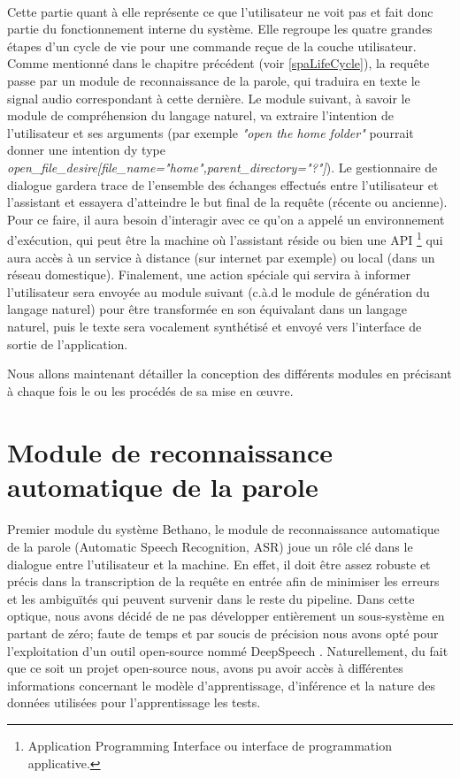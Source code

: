 	\paragraph{}
	\label{system_layer}
	Cette partie quant à elle représente ce que l'utilisateur ne voit pas et fait donc partie du fonctionnement interne du système. Elle regroupe les quatre grandes étapes d'un cycle de vie pour une commande reçue de la couche utilisateur. Comme mentionné dans le chapitre précédent (voir \ref{spaLifeCycle}), la requête passe par un module de reconnaissance de la parole, qui traduira en texte le signal audio correspondant à cette dernière. Le module suivant, à savoir le module de compréhension du langage naturel, va extraire l'intention de l'utilisateur et ses arguments (par exemple \textit{"open the home folder"} pourrait donner  une intention dy type  \textit{open\_file\_desire[file\_name="home",parent\_directory="?"]}). Le gestionnaire de dialogue gardera trace de l'ensemble des échanges effectués entre l'utilisateur et l'assistant et essayera d'atteindre le but final de la requête (récente ou ancienne). Pour ce faire, il aura besoin d'interagir avec ce qu'on a appelé un environnement d'exécution, qui peut être la machine où l'assistant réside ou bien une API \footnote{Application Programming Interface ou interface de programmation applicative.} qui aura accès à un service à distance (sur internet par exemple) ou local (dans un réseau domestique). Finalement, une action spéciale qui servira à informer l'utilisateur sera envoyée au module suivant (c.à.d le module de génération du langage naturel) pour être transformée en son équivalant dans un langage naturel, puis le texte sera vocalement synthétisé et envoyé vers l'interface de sortie de l'application.

	\par
	Nous allons maintenant détailler la conception des différents modules en précisant à chaque fois le ou les procédés de sa mise en \oe{}uvre. 
\section{Module de reconnaissance automatique de la parole}
\paragraph{}
\label{asr_probs}
Premier module du système Bethano, le module de reconnaissance automatique de la parole (Automatic Speech Recognition, ASR) joue un rôle clé dans le dialogue entre l'utilisateur et la machine. En effet, il doit être assez robuste et précis dans la transcription de la requête en entrée afin de minimiser les erreurs et les ambiguïtés qui peuvent survenir dans le reste du pipeline. Dans cette optique, nous avons décidé de ne pas développer entièrement un sous-système en partant de zéro; faute de temps et par soucis de précision nous avons opté pour l'exploitation d'un outil open-source nommé DeepSpeech \cite{deepspeech_paper}. Naturellement, du fait que ce soit un projet open-source nous, avons pu avoir accès à différentes informations concernant le modèle d'apprentissage, d'inférence et la nature des données utilisées pour l'apprentissage les tests.

